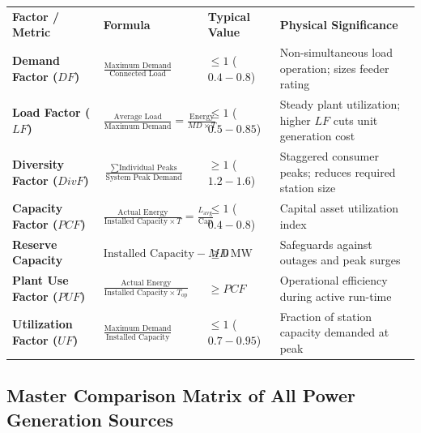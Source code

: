 \documentclass[11pt,a4paper]{article}
\begin{document}
\begin{center}
\small
\begin{tabularx}{\textwidth}{L{3.0cm} L{4.8cm} C{1.8cm} X}
  \color{white}\textbf{Factor / Metric} & \color{white}\textbf{Formula} & \color{white}\textbf{Typical Value} & \color{white}\textbf{Physical Significance} \\
   \textbf{Demand Factor ($DF$)} & $\frac{\text{Maximum Demand}}{\text{Connected Load}}$ & $\le 1$ ($0.4 - 0.8$) & Non-simultaneous load operation; sizes feeder rating \\
  \textbf{Load Factor ($LF$)} & $\frac{\text{Average Load}}{\text{Maximum Demand}} = \frac{\text{Energy}}{MD \times T}$ & $\le 1$ ($0.5 - 0.85$) & Steady plant utilization; higher $LF$ cuts unit generation cost \\
   \textbf{Diversity Factor ($DivF$)} & $\frac{\sum \text{Individual Peaks}}{\text{System Peak Demand}}$ & $\ge 1$ ($1.2 - 1.6$) & Staggered consumer peaks; reduces required station size \\
  \textbf{Capacity Factor ($PCF$)} & $\frac{\text{Actual Energy}}{\text{Installed Capacity} \times T} = \frac{L_{\text{avg}}}{\text{Cap}}$ & $\le 1$ ($0.4 - 0.8$) & Capital asset utilization index \\
   \textbf{Reserve Capacity} & $\text{Installed Capacity} - MD$ & $\ge 0\,\text{MW}$ & Safeguards against outages and peak surges \\
  \textbf{Plant Use Factor ($PUF$)} & $\frac{\text{Actual Energy}}{\text{Installed Capacity} \times T_{\text{op}}}$ & $\ge PCF$ & Operational efficiency during active run-time \\
   \textbf{Utilization Factor ($UF$)} & $\frac{\text{Maximum Demand}}{\text{Installed Capacity}}$ & $\le 1$ ($0.7 - 0.95$) & Fraction of station capacity demanded at peak \\
\end{tabularx}
\end{center}

\subsection{Master Comparison Matrix of All Power Generation Sources}
\end{document}
